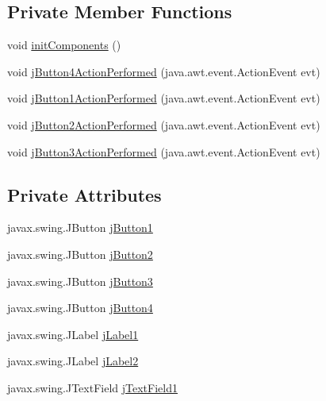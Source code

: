 \subsection*{Private Member Functions}
\begin{DoxyCompactItemize}
\item 
void \mbox{\hyperlink{classpecl6part2_1_1_modulo_controlador_a22ed1ef036362706199db39b74ec7be3}{init\+Components}} ()
\item 
void \mbox{\hyperlink{classpecl6part2_1_1_modulo_controlador_a997e0b7b9614d5bc98d2a9741aa49905}{j\+Button4\+Action\+Performed}} (java.\+awt.\+event.\+Action\+Event evt)
\item 
void \mbox{\hyperlink{classpecl6part2_1_1_modulo_controlador_a5d79b80be4cc9669c8ce67196182e943}{j\+Button1\+Action\+Performed}} (java.\+awt.\+event.\+Action\+Event evt)
\item 
void \mbox{\hyperlink{classpecl6part2_1_1_modulo_controlador_a7090e14e8838ee683046e423ff4f9945}{j\+Button2\+Action\+Performed}} (java.\+awt.\+event.\+Action\+Event evt)
\item 
void \mbox{\hyperlink{classpecl6part2_1_1_modulo_controlador_a404a336512bfd965be43078ee7382328}{j\+Button3\+Action\+Performed}} (java.\+awt.\+event.\+Action\+Event evt)
\end{DoxyCompactItemize}
\subsection*{Private Attributes}
\begin{DoxyCompactItemize}
\item 
javax.\+swing.\+J\+Button \mbox{\hyperlink{classpecl6part2_1_1_modulo_controlador_acdf6c079fea2dc2a66c8b0e5f4ec10e3}{j\+Button1}}
\item 
javax.\+swing.\+J\+Button \mbox{\hyperlink{classpecl6part2_1_1_modulo_controlador_a38f1d50c40672c81a4ec1fa0a5fa1ca9}{j\+Button2}}
\item 
javax.\+swing.\+J\+Button \mbox{\hyperlink{classpecl6part2_1_1_modulo_controlador_a0e4337a4107a44ac33ceb447ee056f59}{j\+Button3}}
\item 
javax.\+swing.\+J\+Button \mbox{\hyperlink{classpecl6part2_1_1_modulo_controlador_a0fd427b07850c91ef7c49d42321b6ec4}{j\+Button4}}
\item 
javax.\+swing.\+J\+Label \mbox{\hyperlink{classpecl6part2_1_1_modulo_controlador_a8f34e28c463eece3072679131fe0c448}{j\+Label1}}
\item 
javax.\+swing.\+J\+Label \mbox{\hyperlink{classpecl6part2_1_1_modulo_controlador_a322924ffd4409beca92e1f9ef6d108e5}{j\+Label2}}
\item 
javax.\+swing.\+J\+Text\+Field \mbox{\hyperlink{classpecl6part2_1_1_modulo_controlador_a7a8c12d92360f65dd601091c44ef20d9}{j\+Text\+Field1}}
\end{DoxyCompactItemize}


